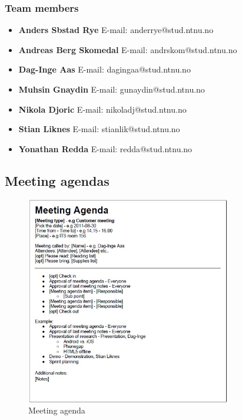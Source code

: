 		\subsubsection{Team members}
				\begin{itemize}
					\item {\bf Anders Sbstad Rye} \newline
							E-mail: anderrye@stud.ntnu.no
					\item {\bf Andreas Berg Skomedal} \newline
							E-mail: andrskom@stud.ntnu.no
					\item {\bf Dag-Inge Aas} \newline
							E-mail: dagingaa@stud.ntnu.no
					\item {\bf Muhsin Gnaydin} \newline
							E-mail: gunaydin@stud.ntnu.no
					\item {\bf Nikola Djoric} \newline
							E-mail: nikoladj@stud.ntnu.no
					\item {\bf Stian Liknes} \newline
							E-mail: stianlik@stud.ntnu.no
					\item {\bf Yonathan Redda} \newline
							E-mail: redda@stud.ntnu.no
				\end{itemize}
				
	\subsection{Meeting agendas}
		\begin{figure}[htb]
			\centering
			\includegraphics[width=0.8\textwidth]{appendix/meeting_agenda.jpg}
			\caption{Meeting agenda}
			\label{fig:meeting-agenda}
		\end{figure}
	
